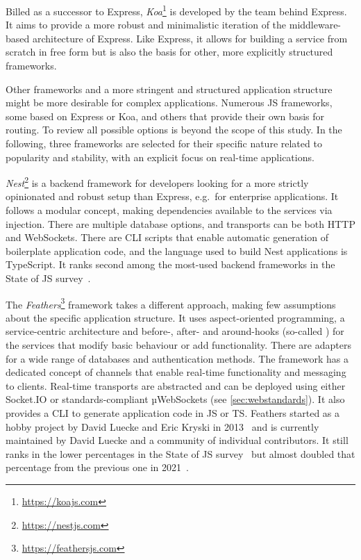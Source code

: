 Billed as a successor to Express, \emph{Koa}\footnote{\url{https://koajs.com}} is developed by the team behind Express.
It aims to provide a more robust and minimalistic iteration of the middleware-based architecture of Express.
Like Express, it allows for building a service from scratch in free form but is also the basis for other, more explicitly structured frameworks.

Other frameworks and a more stringent and structured application structure might be more desirable for complex applications.
Numerous \ac{JS} frameworks, some based on Express or Koa, and others that provide their own basis for routing.
To review all possible options is beyond the scope of this study.
In the following, three frameworks are selected for their specific nature related to popularity and stability, with an explicit focus on real-time applications.



\emph{Nest}\footnote{\url{https://nestjs.com}} is a backend framework for developers looking for a more strictly opinionated and robust setup than Express, e.g.\ for enterprise applications.
It follows a modular concept, making dependencies available to the services via injection.
There are multiple database options, and transports can be both \ac{HTTP} and WebSockets.
There are \ac{CLI} scripts that enable automatic generation of boilerplate application code, and the language used to build Nest applications is TypeScript.
It ranks second among the most-used backend frameworks in the State of JS survey~\parencite{mostUsedBackendFrameworks22}.

The \emph{Feathers}\footnote{\url{https://feathersjs.com}} framework takes a different approach, making few assumptions about the specific application structure.
It uses aspect-oriented programming, a service-centric architecture and before-, after- and around-hooks (so-called ) for the services that modify basic behaviour or add functionality.
There are adapters for a wide range of databases and authentication methods.
The framework has a dedicated concept of channels that enable real-time functionality and messaging to clients.
Real-time transports are abstracted and can be deployed using either Socket.IO or standards-compliant µWebSockets (see \autoref{sec:webstandards}). It also provides a \ac{CLI} to generate application code in \ac{JS} or \ac{TS}.
Feathers started as a hobby project by David Luecke and Eric Kryski in 2013~\parencite{feathersFrameworkHistory} and is currently maintained by David Luecke and a community of individual contributors.
It still ranks in the lower percentages in the State of JS survey~\parencite{mostUsedBackendFrameworks22} but almost doubled that percentage from the previous one in 2021~\parencite{mostUsedBackendFrameworks21}.

